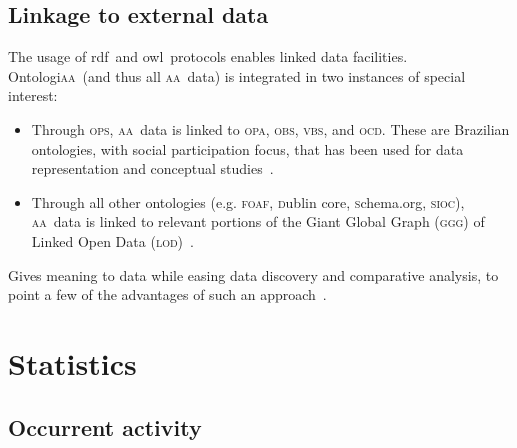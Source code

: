 \documentclass[a4paper, 11pt]{article} %
\newcommand{\schema}{\textsc{s}chema.org}
\newcommand{\ocd}{\textsc{ocd}}
\newcommand{\foaf}{\textsc{foaf}}
\newcommand{\ops}{\textsc{ops}}
\newcommand{\sioc}{\textsc{sioc}}
\newcommand{\ggg}{\textsc{ggg}}
\newcommand{\opa}{\textsc{opa}}
\newcommand{\obs}{\textsc{obs}}
\newcommand{\vbs}{\textsc{vbs}}
\newcommand{\lod}{\textsc{lod}}
\newcommand{\aab}{\textsc{aa}}
\newcommand{\dc}{\textsc{d}ublin {\sc c}ore}
\newcommand{\ontologiaai}{\textsc{O}ntologi\textsc{aa}}
\newcommand{\owl}{{\sc owl}}
\newcommand{\rdf}{{\sc rdf}}
\begin{document}
\subsection{Linkage to external data}
The usage of \rdf\ and \owl\ protocols enables linked data facilities. \ontologiaai\ (and thus all \aab\ data) is integrated in two instances of special interest:
\begin{itemize}
    \item Through \ops, \aab\ data is linked to \opa, \obs, \vbs, and \ocd. These are Brazilian ontologies, with social participation focus, that has been used for data representation and conceptual studies~\cite{pnud5}.
    \item Through all other ontologies (e.g. \foaf, \dc, \schema, \sioc), \aab\ data is linked to relevant portions of the Giant Global Graph (\ggg) of Linked Open Data (\lod)~\cite{LOD}.
\end{itemize}

Gives meaning to data while easing data discovery and comparative analysis, to point a few of the advantages of such an approach~\cite{linkedDataBook}.

\section{Statistics}\label{sec:stats}
\subsection{Occurrent activity}
\end{document}
